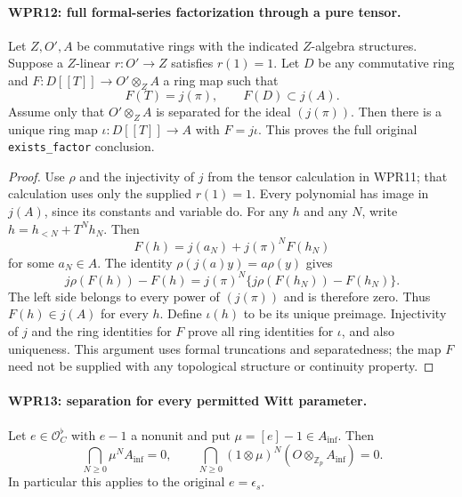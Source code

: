 \paragraph{WPR12: full formal-series factorization through a pure tensor.}
\label{claim:WPR12}
Let $Z,O',A$ be commutative rings with the indicated $Z$-algebra
structures. Suppose a $Z$-linear $r:O'\to Z$ satisfies $r(1)=1$.
Let $D$ be any commutative ring and
$F:D[[T]]\to O'\otimes_Z A$ a ring map such that
\[
 F(T)=j(\pi),\qquad F(D)\subset j(A).
\]
Assume only that $O'\otimes_Z A$ is separated for the ideal
$(j(\pi))$. Then there is a unique ring map
$\iota:D[[T]]\to A$ with $F=j\iota$.
This proves the full original \texttt{exists\_factor} conclusion.

\begin{proof}
Use $\rho$ and the injectivity of $j$ from the tensor calculation
in WPR11; that calculation uses only the supplied $r(1)=1$.
Every polynomial has image in $j(A)$, since its constants and
variable do. For any $h$ and any $N$, write
$h=h_{<N}+T^Nh_N$. Then
\[
 F(h)=j(a_N)+j(\pi)^NF(h_N)
\]
for some $a_N\in A$. The identity
$\rho(j(a)y)=a\rho(y)$ gives
\[
 j\rho(F(h))-F(h)
   =j(\pi)^N\{j\rho(F(h_N))-F(h_N)\}.
\]
The left side belongs to every power of $(j(\pi))$ and is
therefore zero. Thus $F(h)\in j(A)$ for every $h$.
Define $\iota(h)$ to be its unique preimage. Injectivity of $j$
and the ring identities for $F$ prove all ring identities for
$\iota$, and also uniqueness. This argument uses formal
truncations and separatedness; the map $F$ need not be supplied
with any topological structure or continuity property.
\end{proof}

\paragraph{WPR13: separation for every permitted Witt parameter.}
\label{claim:WPR13}
Let $e\in\mathcal O_C^\flat$ with $e-1$ a nonunit and put
$\mu=[e]-1\in A_{\mathrm{inf}}$. Then
\[
 \bigcap_{N\geq0}\mu^NA_{\mathrm{inf}}=0,
 \qquad
 \bigcap_{N\geq0}(1\otimes\mu)^N(O\otimes_{\mathbb Z_p}A_{\mathrm{inf}})=0.
 \tag{WPR.15}
\]
In particular this applies to the original $e=\epsilon_s$.

